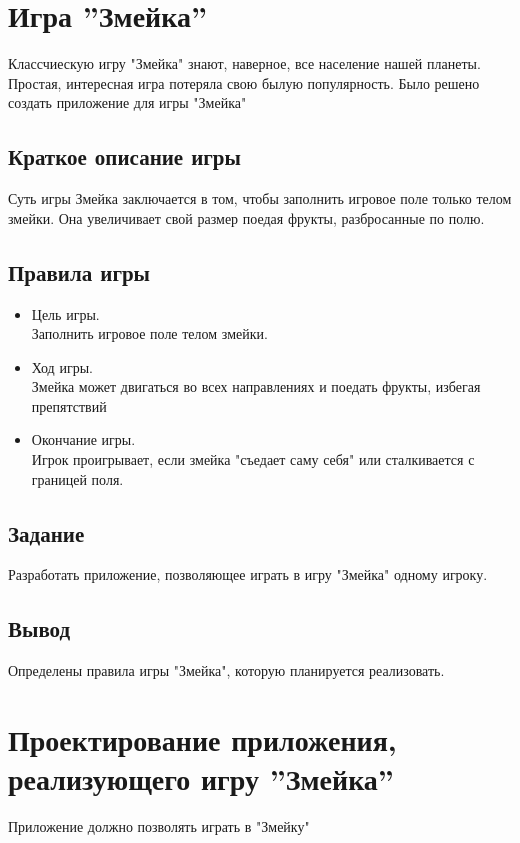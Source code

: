 \documentclass[a4paper]{article}
\begin{document}
\vfill %
\tableofcontents
\newpage

\section{Игра ''Змейка''}
Классчиескую игру "Змейка" знают, наверное, все население нашей планеты. Простая, интересная игра потеряла свою былую популярность. Было решено создать приложение для игры "Змейка" \\


\subsection{Краткое описание игры}
Суть игры Змейка заключается в том, чтобы заполнить игровое поле только телом змейки. Она увеличивает свой размер поедая фрукты, разбросанные по полю.  \\

\subsection{Правила игры}
\begin{itemize}
\item Цель игры.\\
Заполнить игровое поле телом змейки.

\item Ход игры. \\
Змейка может двигаться во всех направлениях и поедать фрукты, избегая препятствий

\item Окончание игры. \\
Игрок проигрывает, если змейка "съедает саму себя" или сталкивается с границей поля.

\end{itemize}
\subsection{Задание}
Разработать приложение, позволяющее играть в игру "Змейка" одному игроку.

\subsection{Вывод}
Определены правила игры "Змейка", которую планируется реализовать. 

\section{Проектирование приложения, реализующего игру ''Змейка''}
Приложение должно позволять играть в "Змейку"
\end{document}
